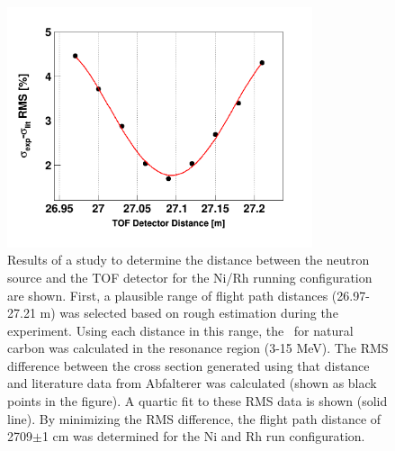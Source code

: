 \begin{figure}[h]
    \centering
    \includegraphics[width=0.8\textwidth]{figures/DistanceStudyNi.png}
    \caption[Determining the time-of-flight detector distance using \cNat\ resonances]
    {Results of a study to determine the distance between
    the neutron source and the TOF detector for the Ni/Rh running configuration
are shown. First, a plausible range of flight path distances (26.97-27.21 m) was
selected based on rough estimation during the experiment. Using each
distance in this range, the \tot\ for natural carbon was calculated in the
resonance region (3-15 MeV). The RMS difference between the cross section
generated using that distance and literature data from Abfalterer
\cite{Abfalterer2000, Abfalterer2001} was calculated (shown as black points in
the figure). A quartic fit to these RMS data is shown (solid line). By minimizing the
RMS difference, the flight path distance of 2709$\pm$1 cm was determined for the
Ni and Rh run configuration.}
    \label{DistanceStudy}
\end{figure}

